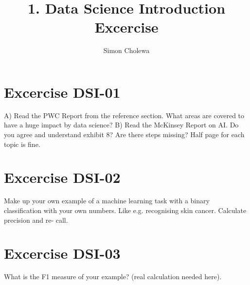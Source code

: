 \documentclass[]{article}
\title{}
\author{}
\begin{document}
\author{Simon Cholewa}
\title{1. Data Science Introduction Excercise}

\maketitle

\section{Excercise DSI-01}
A) Read the PWC Report from the reference section.
What areas are covered to have a huge impact by data science?
B) Read the McKinsey Report on AI.
Do you agree and understand exhibit 8? Are there steps missing?
Half page for each topic is fine.

\section{Excercise DSI-02}
Make up your own example of a machine learning task with a binary classification
with your own numbers. Like e.g. recognising skin cancer. Calculate precision and re-
call.

\section{Excercise DSI-03}
What is the F1 measure of your example? (real calculation needed here).
\end{document}

